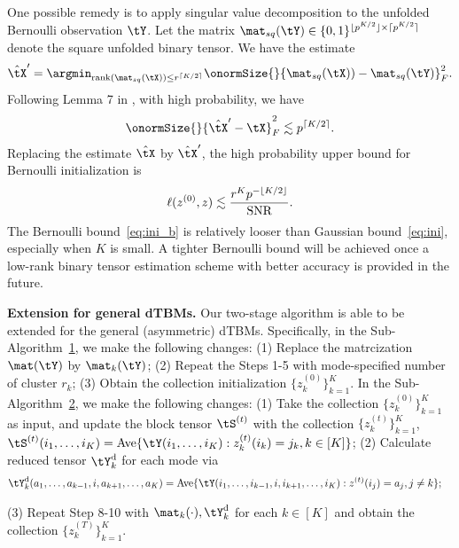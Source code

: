\documentclass[lettersize,onecolumn,journal]{IEEEtran}
\theoremstyle{definition}
\theoremstyle{definition}
\DeclarePairedDelimiter{\ceil}{\lceil}{\rceil}
\DeclarePairedDelimiter{\floor}{\lfloor}{\rfloor}
\begin{document}
{One possible remedy is to apply singular value decomposition to the unfolded Bernoulli observation $\tY$. Let the matrix $\mat_{sq} (\tY) \in \{0,1\}^{\floor{p^{K/2}} \times \ceil{p^{K/2}} }$ denote the square unfolded binary tensor. We have the estimate 
\begin{equation}
    \hat \tX' = \argmin_{\text{rank}(\mat_{sq}(\tX)) \leq r^{\ceil{K/2}}} \onormSize{}{ \mat_{sq}(\tX)) -  \mat_{sq}(\tY)}_F^2.
\end{equation}
Following Lemma 7 in \cite{gao2018community}, with high probability, we have
\begin{equation}
    \onormSize{}{\hat \tX' - \tX}_F^2 \lesssim p^{\ceil{K/2}}.
\end{equation} 
Replacing the estimate $\hat \tX$ by $\hat \tX'$, the high probability upper bound for Bernoulli initialization is
\begin{equation}\label{eq:ini_b}
    \ell(z^{(0)}, z) \lesssim \frac{r^K p^{- \floor{K/2} }}{\text{SNR}}. 
\end{equation}
The Bernoulli bound~\eqref{eq:ini_b} is relatively looser than Gaussian bound~\eqref{eq:ini}, especially when $K$ is small. A tighter Bernoulli bound will be achieved once a low-rank binary tensor estimation scheme with better accuracy is provided in the future.


{\bf Extension for general dTBMs.}
Our two-stage algorithm is able to be extended for the general (asymmetric) dTBMs. Specifically, in the Sub-Algorithm~\hyperref[alg:main]{1}, we make the following changes: (1)
Replace the matrcization $\mat(\tY)$ by $\mat_k(\tY)$; (2) Repeat the Steps 1-5 with mode-specified number of cluster $r_k$; (3) Obtain the collection initialization $ \{z^{(0)}_k\}_{k=1}^K$. In the Sub-Algorithm~\hyperref[alg:main]{2}, we make the following changes: (1) Take the collection $\{z^{(0)}_k\}_{k=1}^K$ as input, and update the block tensor $\tS^{(t)}$ with the collection $\{ z_k^{(t)}\}_{k=1}^K$, $
        \tS^{(t)}(i_1,\ldots, i_K) =  \text{Ave} \{\tY(i_1,\ldots,i_K): z^{(t)}_k(i_k) = j_k, k \in [K]\}$;
(2) Calculate reduced tensor $\tY^{\text{d}}_k$ for each mode via
\begin{align}
    &\tY^{\text{d}}_k(a_1,\ldots,a_{k-1}, i ,a_{k+1},\ldots,a_K) 
    = \text{Ave}\{\tY(i_1,\ldots,i_{k-1},i,i_{k+1},\ldots,i_K): z^{(t)}(i_j) = a_j, j \neq k \}; 
\end{align}

(3) Repeat Step 8-10 with $\mat_k(\cdot), \tY_k^{\text{d}}$ for each $k \in [K]$ and obtain the collection $\{z^{(T)}_k\}_{k=1}^K$. 

}
\end{document}
